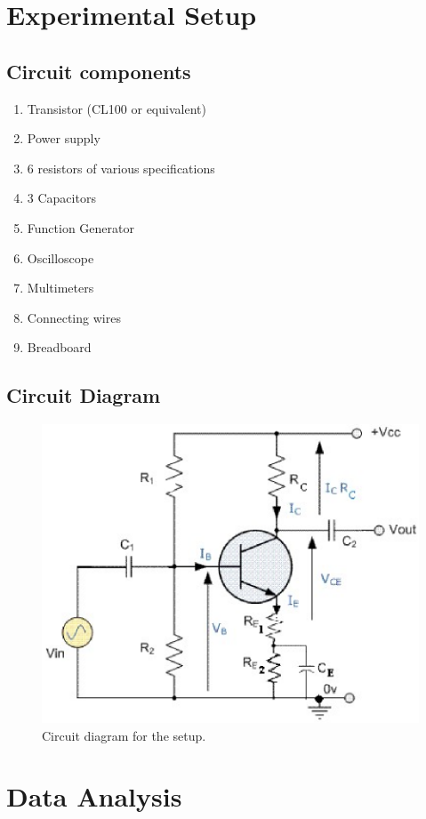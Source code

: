 \section{Experimental Setup}

\subsection*{Circuit components}
    \begin{enumerate}
        \item Transistor (CL100 or equivalent)
        \item Power supply
        \item 6 resistors of various specifications
        \item 3 Capacitors 
        \item Function Generator
        \item Oscilloscope
        \item Multimeters
        \item Connecting wires
        \item Breadboard
    \end{enumerate}

    \subsection*{Circuit Diagram}
    \begin{figure}[H]
        \centering
        \includegraphics[width=0.8\columnwidth]{images/f1.png}
        \caption{Circuit diagram for the setup.}
        \label{fig:1}
    \end{figure}

\section{Data Analysis}

